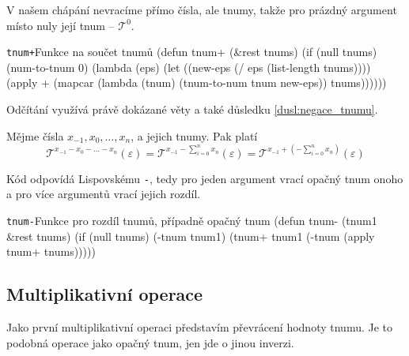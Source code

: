 V našem chápání nevracíme přímo čísla, ale tnumy, takže pro prázdný argument místo nuly její tnum -- $\mathcal{T}^0$.

\begin{lispcode}{\texttt{tnum+}}{Funkce na součet tnumů}
(\textcolor{funkcionalni}{defun} \textcolor{pojmenovan}{tnum+} (&rest tnums)
  (\textcolor{funkcionalni}{if} (\textcolor{funkcionalni}{null} tnums)
    (\textcolor{moje}{num-to-tnum} 0)
    (\textcolor{funkcionalni}{lambda} (eps)
      (\textcolor{vedlejsi}{let} ((new-eps (\textcolor{matematicke}{/} eps (\textcolor{funkcionalni}{list-length} tnums))))
        (\textcolor{funkcionalni}{apply} \textquotesingle\textcolor{moje}{+} 
          (\textcolor{funkcionalni}{mapcar} (\textcolor{funkcionalni}{lambda} (tnum) (\textcolor{moje}{tnum-to-num} tnum new-eps))
            tnums))))))
\end{lispcode}

Odčítání využívá právě dokázané věty a také důsledku \ref{dusl:negace_tnumu}.
\begin{fact}
Mějme čísla $x_{-1}, x_0, \ldots, x_n$, a jejich tnumy. Pak platí
\begin{equation}
\mathcal{T}^{x_{-1}-x_0-\ldots-x_n}(\varepsilon)=\mathcal{T}^{x_{-1}-\sum_{i=0}^nx_n}(\varepsilon)=\mathcal{T}^{x_{-1}+\left(-\sum_{i=0}^nx_n\right)}(\varepsilon)
\end{equation}
\end{fact}

Kód odpovídá Lispovskému \texttt{-}, tedy pro jeden argument vrací opačný tnum onoho a pro více argumentů vrací jejich rozdíl.

\begin{lispcode}{\texttt{tnum-}}{Funkce pro rozdíl tnumů, případně opačný tnum}
(\textcolor{funkcionalni}{defun} \textcolor{pojmenovan}{tnum-} (tnum1 &rest tnums)
  (\textcolor{funkcionalni}{if} (\textcolor{funkcionalni}{null} tnums)
    (\textcolor{moje}{-tnum} tnum1)
    (\textcolor{moje}{tnum+} tnum1 (\textcolor{moje}{-tnum} (\textcolor{funkcionalni}{apply} \textquotesingle\textcolor{moje}{tnum+} tnums)))))
\end{lispcode}

\subsection{Multiplikativní operace}
Jako první multiplikativní operaci představím převrácení hodnoty tnumu. Je to podobná operace jako opačný tnum, jen jde o jinou inverzi.

